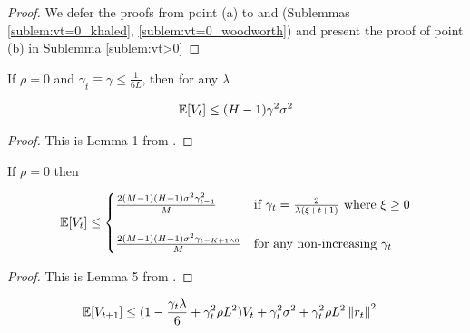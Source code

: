 \begin{proof}
    We defer the proofs from point (a) to \cite{Khaled} and \cite{Woodworth} (Sublemmas \ref{sublem:vt=0_khaled}, \ref{sublem:vt=0_woodworth}) and present the proof of point (b) in Sublemma \ref{sublem:vt>0}
\end{proof}

\begin{sublemma} \label{sublem:vt=0_khaled}
If $\rho = 0$ and $\gamma_{t} \equiv \gamma \leq \frac{1}{6L}$, then for any $\lambda$

    \begin{align}
        \mathbb{E} [V_t] 
        \leq
         (H-1) \gamma^2 \sigma^2
    \end{align}

\end{sublemma}

\begin{proof}
    This is Lemma 1 from \cite{Khaled}. 
\end{proof}

\begin{sublemma} \label{sublem:vt=0_woodworth}
If $\rho = 0$ then 

\begin{align}
    \mathbb{E} [V_t] \leq
        \begin{cases}
            \frac{2 (M - 1) (H - 1) \sigma^2 \gamma_{t-1}^2}{M} & \text{if } \gamma_t = \frac{2}{\lambda(\xi + t + 1)} \text{ where } \xi \geq 0
            \\
            \\
            \frac{2 (M-1) (H-1) \sigma^2 \gamma_{t-K+1 \land 0}}{M} & \text{for any non-increasing } \gamma_t
        \end{cases}
\end{align}

\end{sublemma}

\begin{proof}
    This is Lemma 5 from \cite{Woodworth}.
\end{proof}


\begin{sublemma} \label{sublem:vt_base}
    \begin{align}
        \mathbb{E} [V_{t+1}]
        &\leq
        (1 - \frac {\gamma_{t} \lambda}{6} + \gamma_{t}^2 \rho L^2) V_t
        +  \gamma_{t}^2 \sigma^2 + \gamma_{t}^2 \rho L^2 \left\|r_t\right\|^2
    \end{align}
\end{sublemma}


